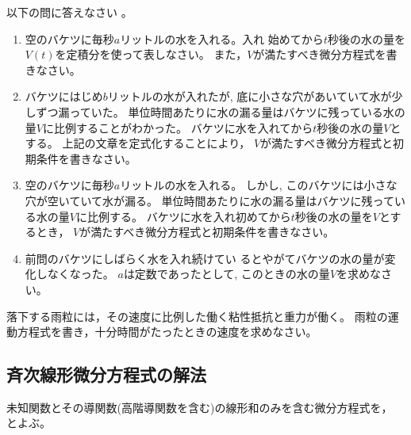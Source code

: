 \documentclass[twocolumn,11pt]{jarticle}
\begin{document}
\nquestion
以下の問に答えなさい
。
\begin{enumerate}
\item\label{item:bucket} 空のバケツに毎秒$a$リットルの水を入れる。入れ
  始めてから$t$秒後の水の量を$V(t)$を定積分を使って表しなさい。
  また，$V$が満たすべき微分方程式を書きなさい。
\item\label{item:bucket-hole} バケツにはじめ$b$リットルの水が入れたが,
  底に小さな穴があいていて水が少しずつ漏っていた。
  単位時間あたりに水の漏る量はバケツに残っている水の量$V$に比例することがわかった。
  バケツに水を入れてから$t$秒後の水の量$V$とする。
  上記の文章を定式化することにより，
  $V$が満たすべき微分方程式と初期条件を書きなさい。
\item\label{item:bucket-in-out}
  空のバケツに毎秒$a$リットルの水を入れる。
  しかし, このバケツには小さな穴が空いていて水が漏る。
  単位時間あたりに水の漏る量はバケツに残っている水の量$V$に比例する。
  バケツに水を入れ初めてから$t$秒後の水の量を$V$とするとき，
  $V$が満たすべき微分方程式と初期条件を書きなさい。
\item\label{item:bucket-final} 前問のバケツにしばらく水を入れ続けてい
  るとやがてバケツの水の量が変化しなくなった。
  $a$は定数であったとして, このときの水の量$V$を求めなさい。
\end{enumerate}

\nquestion
落下する雨粒には，その速度に比例した働く粘性抵抗と重力が働く。
雨粒の運動方程式を書き，十分時間がたったときの速度を求めなさい。

\subsection{斉次線形微分方程式の解法}

未知関数とその導関数(高階導関数を含む)の線形和のみを含む微分方程式を，
とよぶ。
\end{document}
